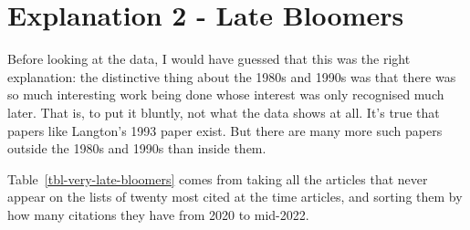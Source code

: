 \documentclass[
  10pt,
  letterpaper,
  DIV=11,
  numbers=noendperiod,
  twoside]{scrartcl}
\begin{document}
\section{Explanation 2 - Late Bloomers}\label{sec-late-bloomers}

Before looking at the data, I would have guessed that this was the right
explanation: the distinctive thing about the 1980s and 1990s was that
there was so much interesting work being done whose interest was only
recognised much later. That is, to put it bluntly, not what the data
shows at all. It's true that papers like Langton's 1993 paper exist. But
there are many more such papers outside the 1980s and 1990s than inside
them.

Table~\ref{tbl-very-late-bloomers} comes from taking all the articles
that never appear on the lists of twenty most cited at the time
articles, and sorting them by how many citations they have from 2020 to
mid-2022.
\end{document}
